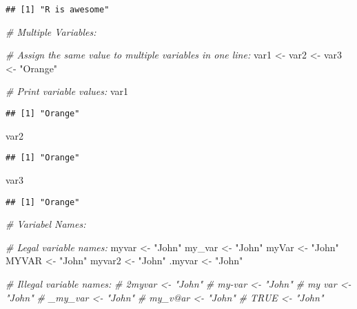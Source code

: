 \documentclass[
]{article}
\newenvironment{Shaded}{\begin{snugshade}}{\end{snugshade}}
\newcommand{\CommentTok}[1]{\textcolor[rgb]{0.56,0.35,0.01}{\textit{#1}}}
\newcommand{\NormalTok}[1]{#1}
\newcommand{\OtherTok}[1]{\textcolor[rgb]{0.56,0.35,0.01}{#1}}
\newcommand{\StringTok}[1]{\textcolor[rgb]{0.31,0.60,0.02}{#1}}
\begin{document}
\begin{verbatim}
## [1] "R is awesome"
\end{verbatim}

\begin{Shaded}
\begin{Highlighting}[]
\CommentTok{\# Multiple Variables:}

\CommentTok{\# Assign the same value to multiple variables in one line:}
\NormalTok{var1 }\OtherTok{\textless{}{-}}\NormalTok{ var2 }\OtherTok{\textless{}{-}}\NormalTok{ var3 }\OtherTok{\textless{}{-}} \StringTok{"Orange"}

\CommentTok{\# Print variable values:}
\NormalTok{var1}
\end{Highlighting}
\end{Shaded}

\begin{verbatim}
## [1] "Orange"
\end{verbatim}

\begin{Shaded}
\begin{Highlighting}[]
\NormalTok{var2}
\end{Highlighting}
\end{Shaded}

\begin{verbatim}
## [1] "Orange"
\end{verbatim}

\begin{Shaded}
\begin{Highlighting}[]
\NormalTok{var3}
\end{Highlighting}
\end{Shaded}

\begin{verbatim}
## [1] "Orange"
\end{verbatim}

\begin{Shaded}
\begin{Highlighting}[]
\CommentTok{\# Variabel Names:}

\CommentTok{\# Legal variable names:}
\NormalTok{myvar }\OtherTok{\textless{}{-}} \StringTok{"John"}
\NormalTok{my\_var }\OtherTok{\textless{}{-}} \StringTok{"John"}
\NormalTok{myVar }\OtherTok{\textless{}{-}} \StringTok{"John"}
\NormalTok{MYVAR }\OtherTok{\textless{}{-}} \StringTok{"John"}
\NormalTok{myvar2 }\OtherTok{\textless{}{-}} \StringTok{"John"}
\NormalTok{.myvar }\OtherTok{\textless{}{-}} \StringTok{"John"}

\CommentTok{\# Illegal variable names:}
\CommentTok{\# 2myvar \textless{}{-} "John"}
\CommentTok{\# my{-}var \textless{}{-} "John"}
\CommentTok{\# my var \textless{}{-} "John"}
\CommentTok{\# \_my\_var \textless{}{-} "John"}
\CommentTok{\# my\_v@ar \textless{}{-} "John"}
\CommentTok{\# TRUE \textless{}{-} "John"}
\end{Highlighting}
\end{Shaded}
\end{document}
